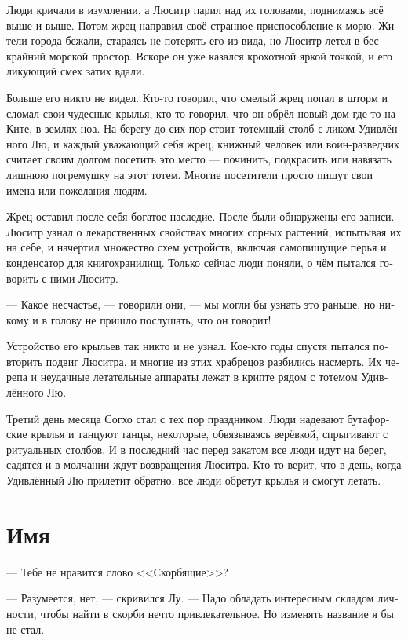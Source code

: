 \documentclass[a4paper,12pt,fleqn]{book}\usepackage{polyglossia}\setdefaultlanguage[babelshorthands=true]{russian}\setotherlanguage{english}\defaultfontfeatures{Ligatures=TeX,Mapping=tex-text}\usepackage{xcolor}\newcommand{\ml}[3]{#2}
\begin{document}
{Люди кричали в изумлении, а Люситр парил над их головами, поднимаясь всё выше и выше.
Потом жрец направил своё странное приспособление к морю.
Жители города бежали, стараясь не потерять его из вида, но Люситр летел в бескрайний морской простор.
Вскоре он уже казался крохотной яркой точкой, и его ликующий смех затих вдали.

Больше его никто не видел.
Кто-то говорил, что смелый жрец попал в шторм и сломал свои чудесные крылья, кто-то говорил, что он обрёл новый дом где-то на Ките, в землях ноа.
На берегу до сих пор стоит тотемный столб с ликом Удивлённого Лю, и каждый уважающий себя жрец, книжный человек или воин-разведчик считает своим долгом посетить это место --- починить, подкрасить или навязать лишнюю погремушку на этот тотем.
Многие посетители просто пишут свои имена или пожелания людям.

Жрец оставил после себя богатое наследие.
После были обнаружены его записи.
Люситр узнал о лекарственных свойствах многих сорных растений, испытывая их на себе, и начертил множество схем устройств, включая самопишущие перья и конденсатор для книгохранилищ.
Только сейчас люди поняли, о чём пытался говорить с ними Люситр.

--- Какое несчастье, --- говорили они, --- мы могли бы узнать это раньше, но никому и в голову не пришло послушать, что он говорит!

Устройство его крыльев так никто и не узнал.
Кое-кто годы спустя пытался повторить подвиг Люситра, и многие из этих храбрецов разбились насмерть.
Их черепа и неудачные летательные аппараты лежат в крипте рядом с тотемом Удивлённого Лю.

Третий день месяца Согхо стал с тех пор праздником.
Люди надевают бутафорские крылья и танцуют танцы, некоторые, обвязываясь верёвкой, спрыгивают с ритуальных столбов.
И в последний час перед закатом все люди идут на берег, садятся и в молчании ждут возвращения Люситра.
Кто-то верит, что в день, когда Удивлённый Лю прилетит обратно, все люди обретут крылья и смогут летать.

\section{Имя}

--- Тебе не нравится слово <<Скорбящие>>?

--- Разумеется, нет, --- скривился Лу.
--- Надо обладать интересным складом личности, чтобы найти в скорби нечто привлекательное.
Но изменять название я бы не стал.

}
\end{document}
